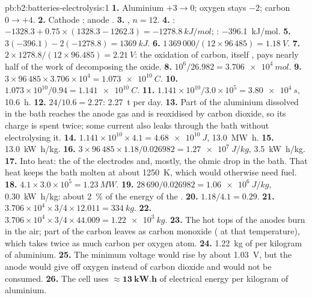 \begin{solution}{pb:b2:batteries-electrolysis:1}
\textbf{1.} Aluminium $+3 \to 0$; oxygen stays $-2$; carbon $0 \to +4$.
\textbf{2.} Cathode ; anode .
\textbf{3.} , $n = 12$.
\textbf{4.} : $-1328.3 + 0.75 \times (1328.3 - 1262.3) = \qty{-1278.8}{kJ/mol}$;
: \qty{-396.1}{kJ/mol}.
\textbf{5.} $3(-396.1) - 2(-1278.8) = \qty{+1369}{kJ}$.
\textbf{6.} $1\,369\,000/(12 \times 96\,485) = \qty{1.18}{V}$.
\textbf{7.} $2 \times 1278.8/(12 \times 96.485) = \qty{2.21}{V}$: the oxidation of carbon,
itself , pays nearly half of the work of decomposing the oxide.
\textbf{8.} $10^6/26.982 = \qty{3.706e4}{mol}$.
\textbf{9.} $3 \times 96\,485 \times 3.706 \times 10^4 = \qty{1.073e10}{C}$.
\textbf{10.} $1.073 \times 10^{10}/0.94 = \qty{1.141e10}{C}$.
\textbf{11.} $1.141 \times 10^{10}/3.0 \times 10^5 = \qty{3.80e4}{s}$, \qty{10.6}{h}.
\textbf{12.} $24/10.6 = 2.27$: \qty{2.27}{t} per day.
\textbf{13.} Part of the aluminium dissolved in the bath reaches the anode gas and
is reoxidised by carbon dioxide, so its charge is spent twice; some current
also leaks through the bath without electrolysing it.
\textbf{14.} $1.141 \times 10^{10} \times 4.1 = \qty{4.68e10}{J}$, \qty{13.0}{MW.h}.
\textbf{15.} \qty{13.0}{kW.h/kg}.
\textbf{16.} $3 \times 96\,485 \times 1.18/0.026982 = \qty{1.27e7}{J/kg}$, \qty{3.5}{kW.h/kg}.
\textbf{17.} Into heat: the  of the electrodes and, mostly, the
ohmic drop in the bath. That heat keeps the bath molten at about
\qty{1250}{K}, which would otherwise need fuel.
\textbf{18.} $4.1 \times 3.0 \times 10^5 = \qty{1.23}{MW}$.
\textbf{19.} $28\,690/0.026982 = \qty{1.06e6}{J/kg}$, \qty{0.30}{kW.h/kg}: about 2~\% of
the energy of the .
\textbf{20.} $1.18/4.1 = 0.29$.
\textbf{21.} $3.706 \times 10^4 \times 3/4 \times 12.011 = \qty{334}{kg}$.
\textbf{22.} $3.706 \times 10^4 \times 3/4 \times 44.009 = \qty{1.22e3}{kg}$.
\textbf{23.} The hot tops of the anodes burn in the air; part of the carbon leaves
as carbon monoxide ( at that temperature), which takes twice as
much carbon per oxygen atom.
\textbf{24.} \qty{1.22}{kg} of  per kilogram of aluminium.
\textbf{25.} The minimum voltage would rise by about \qty{1.03}{V}, but the anode
would give off oxygen instead of carbon dioxide and would not be consumed.
\textbf{26.} The cell uses $\boldsymbol{\approx \qty{13}{kW.h}}$ of electrical
energy per kilogram of aluminium.
\end{solution}
